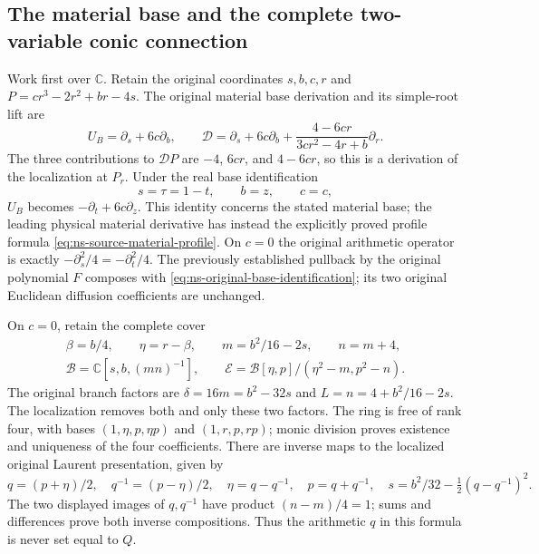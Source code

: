 \subsection{The material base and the complete two-variable conic connection}
Work first over $\mathbb C$. Retain the original coordinates $s,b,c,r$
and $P=cr^3-2r^2+br-4s$. The original material base derivation and
its simple-root lift are
\[
 U_B=\partial_s+6c\partial_b,\qquad
 \mathcal D=\partial_s+6c\partial_b
        +\frac{4-6cr}{3cr^2-4r+b}\partial_r.
\]
The three contributions to $\mathcal DP$ are $-4$, $6cr$, and
$4-6cr$, so this is a derivation of the localization at $P_r$.
Under the real base identification
\begin{equation}\label{eq:ns-original-base-identification}
 s=\tau=1-t,\qquad b=z,\qquad c=c,
\end{equation}
$U_B$ becomes $-\partial_t+6c\partial_z$. This identity concerns
the stated material base; the leading physical material derivative
has instead the explicitly proved profile formula
\eqref{eq:ns-source-material-profile}. On $c=0$ the original
arithmetic operator is exactly $-\partial_s^2/4=-\partial_t^2/4$.
The previously established pullback by the original polynomial $F$
composes with \eqref{eq:ns-original-base-identification}; its two
original Euclidean diffusion coefficients are unchanged.

On $c=0$, retain the complete cover
\begin{gather*}
 \beta=b/4,\qquad \eta=r-\beta,\qquad
 m=b^2/16-2s,\qquad n=m+4,\\
 \mathcal B=\mathbb C[s,b,(mn)^{-1}],\qquad
 \mathcal E=\mathcal B[\eta,p]/(\eta^2-m,p^2-n).
\end{gather*}
The original branch factors are $\delta=16m=b^2-32s$ and
$L=n=4+b^2/16-2s$. The localization removes both and only these
two factors. The ring is free of rank four, with bases
$(1,\eta,p,\eta p)$ and $(1,r,p,rp)$; monic division proves
existence and uniqueness of the four coefficients. There are inverse
maps to the localized original Laurent presentation, given by
\begin{equation}\label{eq:ns-conic-laurent-map}
 q=(p+\eta)/2,\quad q^{-1}=(p-\eta)/2,
 \quad\eta=q-q^{-1},\quad p=q+q^{-1},\quad
 s=b^2/32-\tfrac12(q-q^{-1})^2.
\end{equation}
The two displayed images of $q,q^{-1}$ have product
$(n-m)/4=1$; sums and differences prove both inverse compositions.
Thus the arithmetic $q$ in this formula is never set equal to $Q$.

